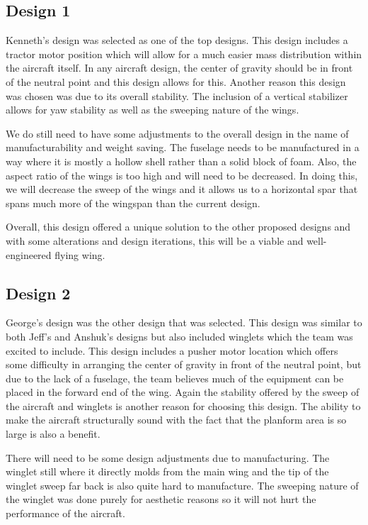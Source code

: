     \subsection{Design 1}
    Kenneth's design was selected as one of the top designs. This design includes a tractor motor position which will allow for a much easier mass distribution within the aircraft itself. In any aircraft design, the center of gravity should be in front of the neutral point and this design allows for this. Another reason this design was chosen was due to its overall stability. The inclusion of a vertical stabilizer allows for yaw stability as well as the sweeping nature of the wings.
    
    We do still need to have some adjustments to the overall design in the name of manufacturability and weight saving. The fuselage needs to be manufactured in a way where it is mostly a hollow shell rather than a solid block of foam. Also, the aspect ratio of the wings is too high and will need to be decreased. In doing this, we will decrease the sweep of the wings and it allows us to a horizontal spar that spans much more of the wingspan than the current design. 
    
    Overall, this design offered a unique solution to the other proposed designs and with some alterations and design iterations, this will be a viable and well-engineered flying wing.
    
    \subsection{Design 2}
    George's design was the other design that was selected. This design was similar to both Jeff's and Anshuk's designs but also included winglets which the team was excited to include. This design includes a pusher motor location which offers some difficulty in arranging the center of gravity in front of the neutral point, but due to the lack of a fuselage, the team believes much of the equipment can be placed in the forward end of the wing. Again the stability offered by the sweep of the aircraft and winglets is another reason for choosing this design. The ability to make the aircraft structurally sound with the fact that the planform area is so large is also a benefit.
    
    There will need to be some design adjustments due to manufacturing. The winglet still where it directly molds from the main wing and the tip of the winglet sweep far back is also quite hard to manufacture. The sweeping nature of the winglet was done purely for aesthetic reasons so it will not hurt the performance of the aircraft. 
    
